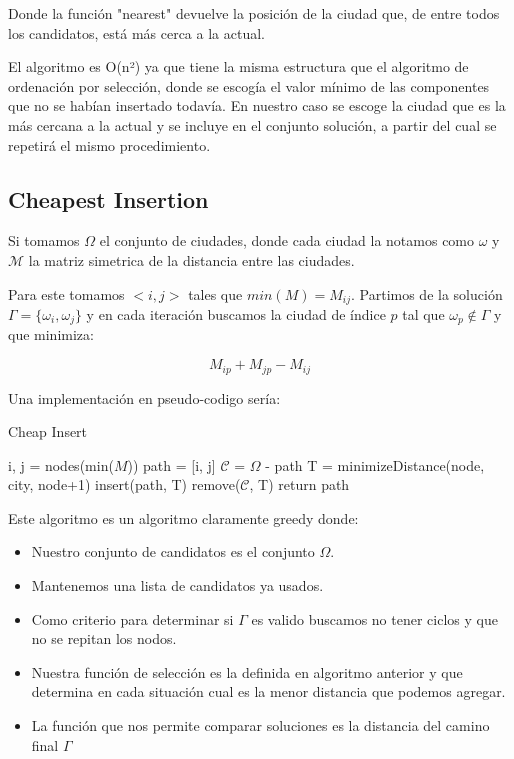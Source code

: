 \documentclass{article}
\begin{document}
Donde la función "nearest" devuelve la posición de la ciudad que, de entre 
todos los candidatos, está más cerca a la actual.

El algoritmo es O(n²) ya que tiene la misma estructura que el algoritmo de
ordenación por selección, donde se escogía el valor mínimo de las componentes 
que no se habían insertado todavía. En nuestro caso se escoge la ciudad que 
es la más cercana a la actual y se incluye en el conjunto solución, a partir 
del cual se repetirá el mismo procedimiento.

\subsection{Cheapest Insertion}

Si tomamos $\Omega$ el conjunto de ciudades, donde cada ciudad la
notamos como $\omega$ y $\mathcal{M}$ la matriz simetrica de la
distancia entre las ciudades.

Para este tomamos $<i,j>$ tales que $min(M) = M_{ij}$. Partimos de la
solución $\Gamma = \{ \omega_i, \omega_j \} $ y en cada iteración
buscamos la ciudad de índice $p$ tal que $\omega_p \notin \Gamma$ y que minimiza:

\[
  M_{ip} + M_{jp} - M_{ij}
\]

Una implementación en pseudo-codigo sería:

\begin{algorithm}[H]
\caption{Cheap Insert}
\begin{algorithmic}
\State i, j = nodes(min($M$))
\State path = [i, j]
\State $\mathcal{C}$ = $\Omega$ - path
\State T = minimizeDistance(node, city, node+1)
\EndFor
\State insert(path, T)
\State remove($\mathcal{C}$, T)
\EndIf
\EndFor
\EndWhile
\State return path
\end{algorithmic}
\end{algorithm}

Este algoritmo es un algoritmo claramente greedy donde:

\begin{itemize}
\item Nuestro conjunto de candidatos es el conjunto $\Omega$.
\item Mantenemos una lista de candidatos ya usados.
\item Como criterio para determinar si $\Gamma$ es valido buscamos no
  tener ciclos y que no se repitan los nodos.
\item Nuestra función de selección es la definida en algoritmo
  anterior y que determina en cada situación cual es la menor
  distancia que podemos agregar.
\item La función que nos permite comparar soluciones es la distancia
  del camino final $\Gamma$
\end{itemize}
\end{document}
